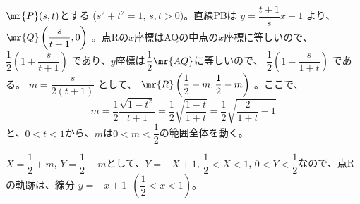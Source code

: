$\mr{P}(s, t)$とする ($s^2+t^2=1$, $s, t>0$)。直線PBは $y=\dfrac{t+1}{s}x-1$ より、 $\mr{Q}\left(\dfrac{s}{t+1}, 0\right)$ 。点Rの$x$座標はAQの中点の$x$座標に等しいので、 $\dfrac{1}{2}\left(1+\dfrac{s}{t+1}\right)$ であり、$y$座標は$\dfrac{1}{2}\mr{AQ}$に等しいので、 $\dfrac{1}{2}\left(1-\dfrac{s}{1+t}\right)$ である。 $m=\dfrac{s}{2(t+1)}$ として、 $\mr{R}\left(\dfrac{1}{2}+m, \dfrac{1}{2}-m\right)$ 。ここで、
\[ m=\frac{1}{2}\frac{\sqrt{1-t^2}}{t+1}=\frac{1}{2}\sqrt{\frac{1-t}{1+t}}=\frac{1}{2}\sqrt{\frac{2}{1+t}-1} \]
と、$0<t<1$から、$m$は$0<m<\dfrac{1}{2}$の範囲全体を動く。

$X=\dfrac{1}{2}+m$, $Y=\dfrac{1}{2}-m$として、$Y=-X+1$, $\dfrac{1}{2}<X<1$, $0<Y<\dfrac{1}{2}$なので、点Rの軌跡は、線分 $y=-x+1$~$\left(\dfrac{1}{2}<x<1\right)$。